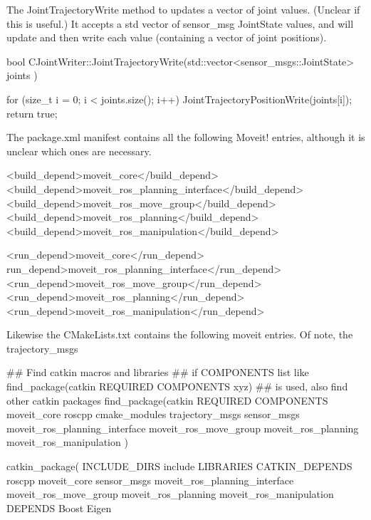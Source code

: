 The Joint\-Trajectory\-Write method to updates a vector of joint values. (Unclear if this is useful.) It accepts a std vector of sensor\-\_\-msg Joint\-State values, and will update and then write each value (containing a vector of joint positions). \begin{DoxyVerb}bool CJointWriter::JointTrajectoryWrite(std::vector<sensor_msgs::JointState> joints ) {

   for (size_t i = 0; i < joints.size(); i++) {
        JointTrajectoryPositionWrite(joints[i]);
    }
    return true;
}
\end{DoxyVerb}


The package.\-xml manifest contains all the following Moveit! entries, although it is unclear which ones are necessary. \begin{DoxyVerb}    <build_depend>moveit_core</build_depend>
    <build_depend>moveit_ros_planning_interface</build_depend>
    <build_depend>moveit_ros_move_group</build_depend>
    <build_depend>moveit_ros_planning</build_depend>
    <build_depend>moveit_ros_manipulation</build_depend>

    <run_depend>moveit_core</run_depend>
    run_depend>moveit_ros_planning_interface</run_depend>
    <run_depend>moveit_ros_move_group</run_depend>
    <run_depend>moveit_ros_planning</run_depend>
    <run_depend>moveit_ros_manipulation</run_depend>    
\end{DoxyVerb}


Likewise the C\-Make\-Lists.\-txt contains the following moveit entries. Of note, the trajectory\-\_\-msgs \begin{DoxyVerb}## Find catkin macros and libraries
## if COMPONENTS list like find_package(catkin REQUIRED COMPONENTS xyz)
## is used, also find other catkin packages
find_package(catkin REQUIRED COMPONENTS
  moveit_core
  roscpp
  cmake_modules
  trajectory_msgs
  sensor_msgs
    moveit_ros_planning_interface
    moveit_ros_move_group
    moveit_ros_planning
    moveit_ros_manipulation
)

catkin_package(
  INCLUDE_DIRS
    include
  LIBRARIES
  CATKIN_DEPENDS
    roscpp
    moveit_core
    sensor_msgs
    moveit_ros_planning_interface
    moveit_ros_move_group
    moveit_ros_planning
    moveit_ros_manipulation
  DEPENDS
    Boost
    Eigen\end{DoxyVerb}
 
